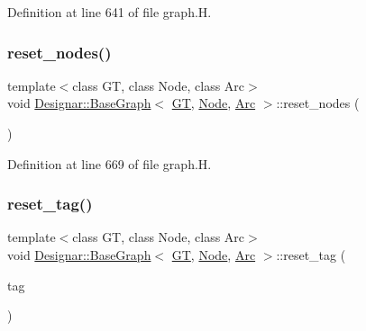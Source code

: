 Definition at line 641 of file graph.\+H.

\mbox{\label{class_designar_1_1_base_graph_a1b21c48fed41f36ad4158d718f837c89}} 
\subsubsection{\texorpdfstring{reset\+\_\+nodes()}{reset\_nodes()}}
{\footnotesize\ttfamily template$<$class GT, class Node, class Arc$>$ \\
void \hyperlink{class_designar_1_1_base_graph}{Designar\+::\+Base\+Graph}$<$ \hyperlink{demo-buildgraph_8_c_a3001c40d2c31ca87ed96cd7d1334a55e}{GT}, \hyperlink{namespace_designar_a5af326c65aa2bd26b26c410f2030d09e}{Node}, \hyperlink{namespace_designar_a3f55fb5513d62ff47cbc8f72b8e95d6f}{Arc} $>$\+::reset\+\_\+nodes (\begin{DoxyParamCaption}{ }\end{DoxyParamCaption})\hspace{0.3cm}{\ttfamily [inline]}}



Definition at line 669 of file graph.\+H.

\mbox{\label{class_designar_1_1_base_graph_ae8845b2eb9d33f62684c8e5acc7c91b7}} 
\subsubsection{\texorpdfstring{reset\+\_\+tag()}{reset\_tag()}}
{\footnotesize\ttfamily template$<$class GT, class Node, class Arc$>$ \\
void \hyperlink{class_designar_1_1_base_graph}{Designar\+::\+Base\+Graph}$<$ \hyperlink{demo-buildgraph_8_c_a3001c40d2c31ca87ed96cd7d1334a55e}{GT}, \hyperlink{namespace_designar_a5af326c65aa2bd26b26c410f2030d09e}{Node}, \hyperlink{namespace_designar_a3f55fb5513d62ff47cbc8f72b8e95d6f}{Arc} $>$\+::reset\+\_\+tag (\begin{DoxyParamCaption}\item[{\hyperlink{namespace_designar_ac91366256ea6ea6ac5fd483d55a7499e}{Graph\+Tag}}]{tag }\end{DoxyParamCaption})\hspace{0.3cm}{\ttfamily [inline]}}



